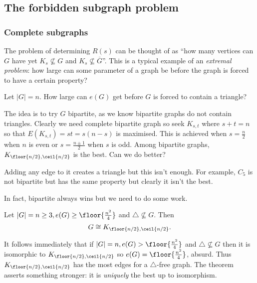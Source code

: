 \documentclass[a4paper]{article}
\begin{document}
\subsection{The forbidden subgraph problem}

\subsubsection{Complete subgraphs}

The problem of determining \(R(s)\) can be thought of as ``how many vertices can \(G\) have yet \(K_s \nsubseteq G\) and \(K_s \nsubseteq \overline G\)''. This is a typical example of an \emph{extremal problem}: how large can some parameter of a graph be before the graph is forced to have a certain property?

\begin{eg}
  Let \(|G| = n\). How large can \(e(G)\) get before \(G\) is forced to contain a triangle?

  The idea is to try \(G\) bipartite, as we know bipartite graphs do not contain triangles. Clearly we need complete bipartite graph so seek \(K_{s, t}\) where \(s + t = n\) so that \(E(K_{s, t}) = st = s(n - s)\) is maximised. This is achieved when \(s = \frac{n}{2}\) when \(n\) is even or \(s = \frac{n \pm 1}{2}\) when \(s\) is odd. Among bipartite graphs, \(K_{\floor{n/2}, \ceil{n/2}}\) is the best. Can we do better?

  Adding any edge to it creates a triangle but this isn't enough. For example, \(C_5\) is not bipartite but has the same property but clearly it isn't the best.
  \begin{center}
  \end{center}
\end{eg}

In fact, bipartite always wins but we need to do some work.

\begin{proposition}
  Let \(|G| = n \geq 3, e(G) \geq \floor{\frac{n^2}{4}}\) and \(\triangle \nsubseteq G\). Then
  \[
    G \cong K_{\floor{n/2}, \ceil{n/2}}.
  \]
\end{proposition}

\begin{remark}
  It follows immediately that if \(|G| = n, e(G) > \floor{\frac{n^2}{4}}\) and \(\triangle \nsubseteq G\) then it is isomorphic to \(K_{\floor{n/2}, \ceil{n/2}}\) so \(e(G) = \floor{\frac{n^2}{4}}\), absurd. Thus \(K_{\floor{n/2}, \ceil{n/2}}\) has the most edges for a \(\triangle\)-free graph. The theorem asserts something stronger: it is \emph{uniquely} the best up to isomorphism.
\end{remark}
\end{document}
